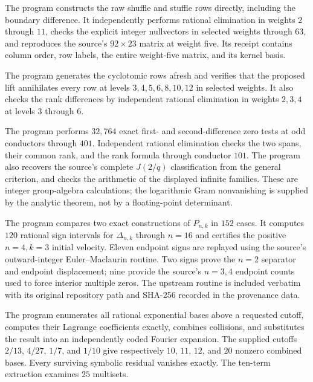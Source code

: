 \documentclass[11pt,a4paper]{article}
\theoremstyle{definition}
\theoremstyle{remark}
\numberwithin{equation}{section}
\begin{document}
\begin{description}[style=nextline,leftmargin=0pt,labelwidth=0pt,labelsep=0pt]
\item[Gaussian ranks.]
The program  constructs the raw
shuffle and stuffle rows directly, including the boundary difference.
It independently performs rational elimination in weights $2$ through
$11$, checks the explicit integer nullvectors in selected weights
through $63$, and reproduces the source's $92\times23$ matrix at
weight five. Its receipt contains column order, row labels, the entire
weight-five matrix, and its kernel basis.

\item[Universal lift.]
The program  generates the
cyclotomic rows afresh and verifies that the proposed lift annihilates
every row at levels $3,4,5,6,8,10,12$ in selected weights. It also
checks the rank differences by independent rational elimination in
weights $2,3,4$ at levels $3$ through $6$.

\item[Herglotz symbol calculations.]
The program  performs $32{,}764$ exact
first- and second-difference zero tests at odd conductors through $401$.
Independent rational elimination checks the two spans, their common
rank, and the rank formula through conductor $101$. The program also
recovers the source's complete $J(2/q)$ classification from the general
criterion, and checks the arithmetic of the displayed infinite families.
These are integer group-algebra calculations; the logarithmic Gram
nonvanishing is supplied by the analytic theorem, not by a floating-point
determinant.

\item[Lerch polynomial identities and endpoint certificates.]
The program  compares two exact
constructions of $P_{n,k}$ in $152$ cases. It computes $120$ rational
sign intervals for $\Delta_{n,k}$ through $n=16$ and certifies the
positive $n=4,k=3$ initial velocity. Eleven endpoint signs are replayed
using the source's outward-integer Euler--Maclaurin routine. Two signs
prove the $n=2$ separator and endpoint displacement; nine provide the
source's $n=3,4$ endpoint counts used to force interior multiple zeros.
The upstream routine is included verbatim with its original repository
path and SHA-256 recorded in the provenance data.

\item[Angular coefficients.]
The program  enumerates all rational
exponential bases above a requested cutoff, computes their Lagrange
coefficients exactly, combines collisions, and substitutes the result
into an independently coded Fourier expansion. The supplied cutoffs
$2/13$, $4/27$, $1/7$, and $1/10$ give respectively $10$, $11$, $12$,
and $20$ nonzero combined bases. Every surviving symbolic residual
vanishes exactly. The ten-term extraction examines $25$ multisets.


\end{description}
\end{document}
